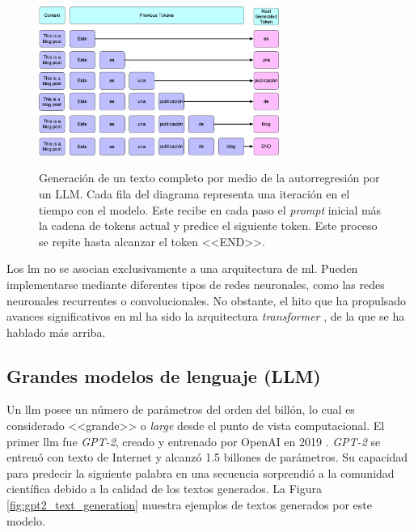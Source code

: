 \begin{figure}[H]
    \caption[Generación de un texto completo por medio de la autorregresión por un LLM]{Generación de un texto completo por medio de la autorregresión por un LLM. Cada fila del diagrama representa una iteración en el tiempo con el modelo. Este recibe en cada paso el \emph{prompt} inicial más la cadena de tokens actual y predice el siguiente token. Este proceso se repite hasta alcanzar el token <<END>>.}
    \centering
    \includegraphics[width=0.7\textwidth]{./figuras/text-gen-diagram-autoregressive.png}
    \label{fig:llm_generation_example}
\end{figure}

Los \gls{lm} no se asocian exclusivamente a una arquitectura de \gls{ml}. Pueden implementarse mediante diferentes tipos de redes neuronales, como las redes neuronales recurrentes o convolucionales. No obstante, el hito que ha propulsado avances significativos en \gls{ml} ha sido la arquitectura \emph{transformer} \citep{vaswaniAttentionAllYou2017}, de la que se ha hablado más arriba.

\subsection{Grandes modelos de lenguaje (LLM)}

Un \gls{llm} posee un número de parámetros del orden del billón, lo cual es considerado <<grande>> o \emph{large} desde el punto de vista computacional. El primer \gls{llm} fue \emph{GPT-2}, creado y entrenado por OpenAI en 2019 \citep{radfordLanguageModelsAre2019}. \emph{GPT-2} se entrenó con texto de Internet y alcanzó 1.5 billones de parámetros. Su capacidad para predecir la siguiente palabra en una secuencia sorprendió a la comunidad científica debido a la calidad de los textos generados. La Figura \ref{fig:gpt2_text_generation} muestra ejemplos de textos generados por este modelo.

